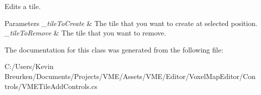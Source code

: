 Edits a tile. 


\begin{DoxyParams}{Parameters}
{\em \+\_\+tile\+To\+Create} & The tile that you want to create at selected position.\\
\hline
{\em \+\_\+tile\+To\+Remove} & The tile that you want to remove.\\
\hline
\end{DoxyParams}


The documentation for this class was generated from the following file\+:\begin{DoxyCompactItemize}
\item 
C\+:/\+Users/\+Kevin Breurken/\+Documents/\+Projects/\+V\+M\+E/\+Assets/\+V\+M\+E/\+Editor/\+Voxel\+Map\+Editor/\+Controls/V\+M\+E\+Tile\+Add\+Controls.\+cs\end{DoxyCompactItemize}
